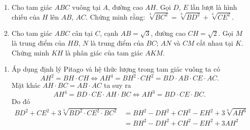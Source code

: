 \begin{ex}%
	\begin{enumerate}
		\item Cho tam giác $ABC$ vuông tại $A$, đường cao $AH$. Gọi $D$, $E$ lần lượt là hình chiếu của $H$ lên $AB$, $AC$. Chứng minh rằng: $\sqrt[3]{BC^2} =  \sqrt[3]{BD^2} + \sqrt[3]{CE^2}$.
		\item  Cho tam giác $ABC$ cân tại $C$, cạnh $AB = \sqrt{3}$, đường cao $CH = \sqrt{2}$. Gọi $M$ là trung điểm của $HB$, $N$ là trung điểm của $BC$; $AN$ và $CM$ cắt nhau tại $K$. Chứng minh $KH$ là phân giác của tam giác $AKM$.
		\end{enumerate}
	\loigiai
	{
\begin{enumerate}
\item  
{}	
	Áp dụng định lý Pitago và hệ thức lượng trong tam giác vuông ta có
$$AH^2 = BH\cdot CH\Leftrightarrow AH^{4} = BH^{2}\cdot CH^{2} = BD\cdot AB\cdot CE\cdot AC.$$
Mặt khác $AH\cdot BC = AB\cdot AC$ ta suy ra
$$AH^{4} = BD\cdot CE\cdot AH\cdot BC\Leftrightarrow AH^{3} =  BD\cdot CE\cdot BC.$$ 
Do đó 
\begin{align*}
BD^2 + CE^2 + 3\sqrt[3]{BD^2\cdot CE^2\cdot BC^2} &= BH^2 - DH^2 + CH^2 - EH^2 + 3\sqrt[3]{AH^6}\\
&= BH^2 - DH^2 + CH^2 - EH^2 + 3AH^2\\

\end{align*}
\end{enumerate}}
\end{ex}
